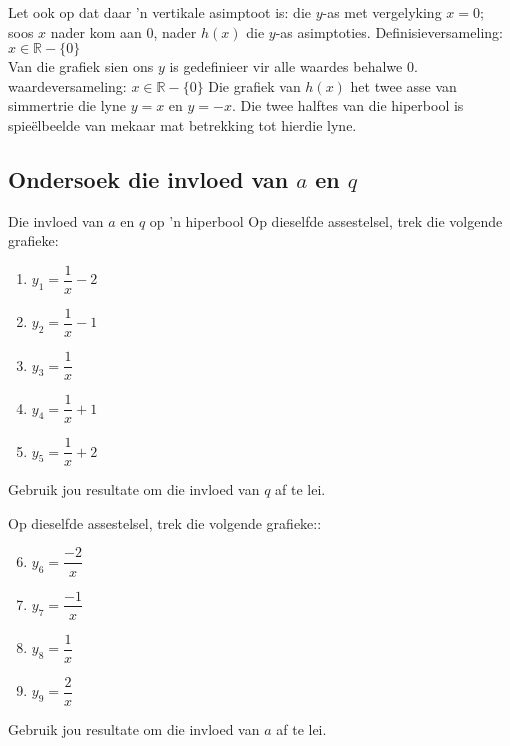 \begin{wex}
{Let ook op dat daar 'n vertikale asimptoot is: die $y$-as met vergelyking $x=0$; soos $x$ nader kom aan $0$, nader $h(x)$ die $y$-as asimptoties.
Definisieversameling: $x \in \mathbb{R} - \{0\}$\\
Van die grafiek sien ons $y$ is gedefinieer vir alle waardes behalwe $0$.\\
waardeversameling: $x \in \mathbb{R} - \{0\}$ 
Die grafiek van $h(x)$ het twee asse van simmertrie die lyne $y=x$ en $y=-x$. Die twee halftes van die hiperbool is spie\"elbeelde van mekaar mat betrekking tot hierdie lyne. 
}
\end{wex}




\subsection*{Ondersoek die invloed van $a$ en $q$ }
\begin{Investigation}{Die invloed van $a$ en $q$ op 'n hiperbool}
 Op dieselfde assestelsel, trek die volgende grafieke:
  \begin{enumerate}[itemsep=3pt, label=\textbf{\arabic*}. ] 
  \item $y_1=\dfrac{1}{x}-2$
  \item $y_2=\dfrac{1}{x}-1$
  \item $y_3=\dfrac{1}{x}$
  \item $y_4=\dfrac{1}{x}+1$
  \item $y_5=\dfrac{1}{x}+2$
  \end{enumerate}
Gebruik jou resultate om die invloed van  $q$ af te lei.\par

Op dieselfde assestelsel, trek die volgende grafieke::
\begin{enumerate}[itemsep=3pt, label=\textbf{\arabic*}. ] 
\setcounter{enumi}{5}
\item $y_6=\dfrac{-2}{x}$
\item $y_7=\dfrac{-1}{x}$
\item $y_8=\dfrac{1}{x}$
\item $y_9=\dfrac{2}{x}$
\end{enumerate}
Gebruik jou resultate om die invloed van $a$ af te lei.
\end{Investigation}

